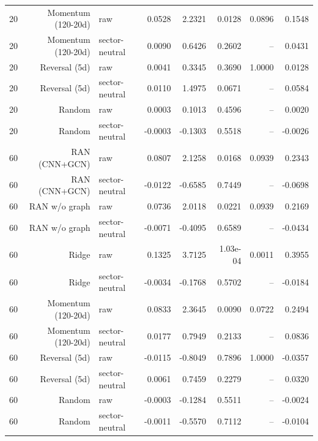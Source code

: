 \documentclass[10pt]{article}
\begin{document}
\begin{longtable}{rrlrrrrr}
20 & Momentum (120-20d) & raw & 0.0528 & 2.2321 & 0.0128 & 0.0896 & 0.1548 \\
20 & Momentum (120-20d) & sector-neutral & 0.0090 & 0.6426 & 0.2602 & -- & 0.0431 \\
20 & Reversal (5d) & raw & 0.0041 & 0.3345 & 0.3690 & 1.0000 & 0.0128 \\
20 & Reversal (5d) & sector-neutral & 0.0110 & 1.4975 & 0.0671 & -- & 0.0584 \\
20 & Random & raw & 0.0003 & 0.1013 & 0.4596 & -- & 0.0020 \\
20 & Random & sector-neutral & -0.0003 & -0.1303 & 0.5518 & -- & -0.0026 \\
60 & RAN (CNN+GCN) & raw & 0.0807 & 2.1258 & 0.0168 & 0.0939 & 0.2343 \\
60 & RAN (CNN+GCN) & sector-neutral & -0.0122 & -0.6585 & 0.7449 & -- & -0.0698 \\
60 & RAN w/o graph & raw & 0.0736 & 2.0118 & 0.0221 & 0.0939 & 0.2169 \\
60 & RAN w/o graph & sector-neutral & -0.0071 & -0.4095 & 0.6589 & -- & -0.0434 \\
60 & Ridge & raw & 0.1325 & 3.7125 & 1.03e-04 & 0.0011 & 0.3955 \\
60 & Ridge & sector-neutral & -0.0034 & -0.1768 & 0.5702 & -- & -0.0184 \\
60 & Momentum (120-20d) & raw & 0.0833 & 2.3645 & 0.0090 & 0.0722 & 0.2494 \\
60 & Momentum (120-20d) & sector-neutral & 0.0177 & 0.7949 & 0.2133 & -- & 0.0836 \\
60 & Reversal (5d) & raw & -0.0115 & -0.8049 & 0.7896 & 1.0000 & -0.0357 \\
60 & Reversal (5d) & sector-neutral & 0.0061 & 0.7459 & 0.2279 & -- & 0.0320 \\
60 & Random & raw & -0.0003 & -0.1284 & 0.5511 & -- & -0.0024 \\
60 & Random & sector-neutral & -0.0011 & -0.5570 & 0.7112 & -- & -0.0104 \\
\bottomrule
\end{longtable}
\endgroup
\end{document}
